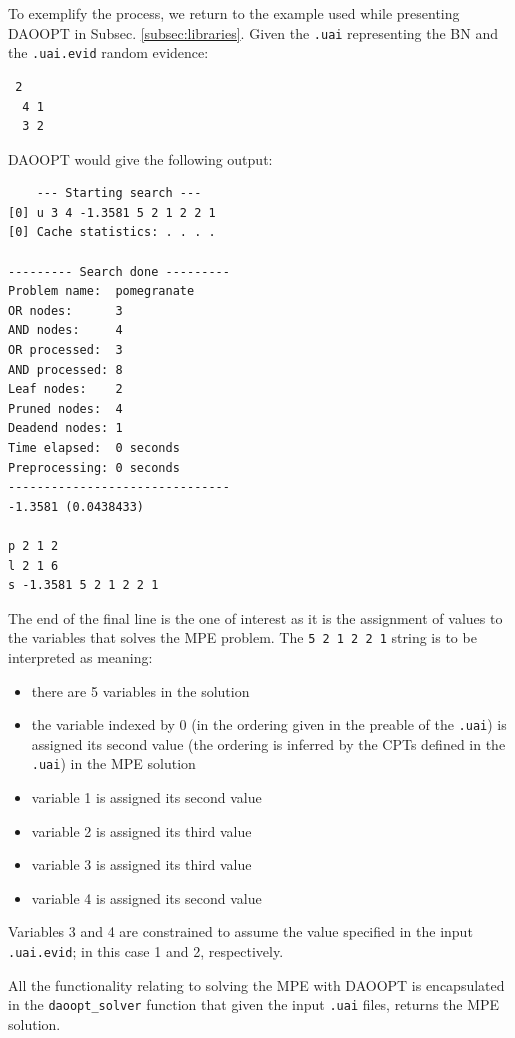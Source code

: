 To exemplify the process, we return to the example used while presenting DAOOPT in Subsec. \ref{subsec:libraries}.
Given the \texttt{.uai} representing the BN and the \texttt{.uai.evid} random evidence:
\begin{verbatim}
 2
  4 1
  3 2
\end{verbatim}
DAOOPT would give the following output:
\begin{verbatim}
	--- Starting search ---
[0] u 3 4 -1.3581 5 2 1 2 2 1
[0] Cache statistics: . . . .

--------- Search done ---------
Problem name:  pomegranate
OR nodes:      3
AND nodes:     4
OR processed:  3
AND processed: 8
Leaf nodes:    2
Pruned nodes:  4
Deadend nodes: 1
Time elapsed:  0 seconds
Preprocessing: 0 seconds
-------------------------------
-1.3581 (0.0438433)

p 2 1 2
l 2 1 6
s -1.3581 5 2 1 2 2 1
\end{verbatim}
The end of the final line is the one of interest as it is the assignment of values to the variables that solves the MPE problem.
The \texttt{5 2 1 2 2 1} string is to be interpreted as meaning:
\begin{itemize}
  \item there are 5 variables in the solution
  \item the variable indexed by 0 (in the ordering given in the preable of the \texttt{.uai}) is assigned its second value (the ordering is inferred by the CPTs defined in the \texttt{.uai}) in the MPE solution
  \item variable 1 is assigned its second value
  \item variable 2 is assigned its third value
  \item variable 3 is assigned its third value
  \item variable 4 is assigned its second value
\end{itemize}
Variables 3 and 4 are constrained to assume the value specified in the input \texttt{.uai.evid}; in this case 1 and 2, respectively.

All the functionality relating to solving the MPE with DAOOPT is encapsulated in the \texttt{daoopt\_solver} function that given the input \texttt{.uai} files, returns the MPE solution.

